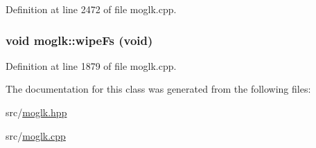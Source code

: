 Definition at line 2472 of file moglk.cpp.\hypertarget{classmoglk_de1cb00a156f01b9948b7ade18a6754b}{
\subsubsection[{wipeFs}]{\setlength{\rightskip}{0pt plus 5cm}void moglk::wipeFs (void)}}
\label{classmoglk_de1cb00a156f01b9948b7ade18a6754b}




Definition at line 1879 of file moglk.cpp.

The documentation for this class was generated from the following files:\begin{CompactItemize}
\item 
src/\hyperlink{moglk_8hpp}{moglk.hpp}\item 
src/\hyperlink{moglk_8cpp}{moglk.cpp}\end{CompactItemize}
